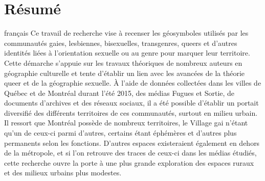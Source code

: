 \chapter*{Résumé}                      %

\begin{otherlanguage*}{français}
  Ce travail de recherche vise à recenser les géosymboles utilisés par les communautés gaies, lesbiennes, bisexuelles, transgenres, queers et d'autres identités liées à l'orientation sexuelle ou au genre pour marquer leur territoire.
  Cette démarche s'appuie sur les travaux théoriques de nombreux auteurs en géographie culturelle et tente d'établir un lien avec les avancées de la théorie queer et de la géographie sexuelle.
  À l'aide de données collectées dans les villes de Québec et de Montréal durant l'été 2015, des médias Fugues et Sortie, de documents d'archives et des réseaux sociaux, il a été possible d'établir un portait diversifié des différents territoires de ces communautés, surtout en milieu urbain.
  Il ressort que Montréal possède de nombreux territoires, le Village gai n'étant qu'un de ceux-ci parmi d'autres, certains étant éphémères et d'autres plus permanents selon les fonctions.
  D'autres espaces existeraient également en dehors de la métropole, et si l'on retrouve des traces de ceux-ci dans les médias étudiés, cette recherche ouvre la porte à une plus grande exploration des espaces ruraux et des milieux urbains plus modestes.
\end{otherlanguage*}
